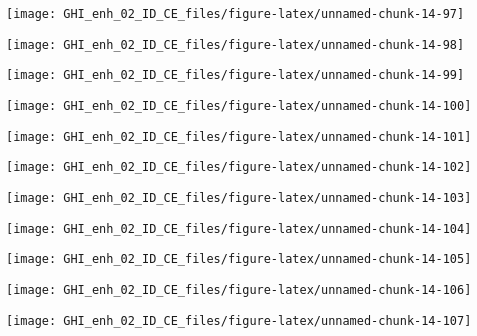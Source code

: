\documentclass[
  10pt,
  a4paper,oneside]{article}
\begin{document}
\begin{center}\texttt{[image: GHI\_enh\_02\_ID\_CE\_files/figure-latex/unnamed-chunk-14-97]} \end{center}

\begin{center}\texttt{[image: GHI\_enh\_02\_ID\_CE\_files/figure-latex/unnamed-chunk-14-98]} \end{center}

\begin{center}\texttt{[image: GHI\_enh\_02\_ID\_CE\_files/figure-latex/unnamed-chunk-14-99]} \end{center}

\begin{center}\texttt{[image: GHI\_enh\_02\_ID\_CE\_files/figure-latex/unnamed-chunk-14-100]} \end{center}

\begin{center}\texttt{[image: GHI\_enh\_02\_ID\_CE\_files/figure-latex/unnamed-chunk-14-101]} \end{center}

\begin{center}\texttt{[image: GHI\_enh\_02\_ID\_CE\_files/figure-latex/unnamed-chunk-14-102]} \end{center}

\begin{center}\texttt{[image: GHI\_enh\_02\_ID\_CE\_files/figure-latex/unnamed-chunk-14-103]} \end{center}

\begin{center}\texttt{[image: GHI\_enh\_02\_ID\_CE\_files/figure-latex/unnamed-chunk-14-104]} \end{center}

\begin{center}\texttt{[image: GHI\_enh\_02\_ID\_CE\_files/figure-latex/unnamed-chunk-14-105]} \end{center}

\begin{center}\texttt{[image: GHI\_enh\_02\_ID\_CE\_files/figure-latex/unnamed-chunk-14-106]} \end{center}

\begin{center}\texttt{[image: GHI\_enh\_02\_ID\_CE\_files/figure-latex/unnamed-chunk-14-107]} \end{center}
\end{document}
